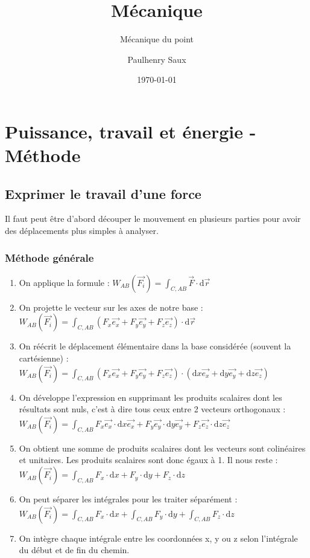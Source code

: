 \documentclass[french]{yLectureNote}
\title{Mécanique}
\subtitle{Mécanique du point}
\author{Paulhenry Saux}
\date{\today}
\renewcommand{\vec}{\overrightarrow}
\newcommand{\dd}[0]{\mathrm{d}}
\begin{document}
\setcounter{chapter}{7}
	\chapter{Puissance, travail et énergie - Méthode}
\section{Exprimer le travail d'une force}
Il faut peut \^etre d'abord découper le mouvement en plusieurs parties pour avoir des déplacements plus simples à analyser.
\subsection{Méthode générale}
\begin{enumerate}
 \item On applique la formule : $W_{AB}(\vec{F_i}) = \int_{C,AB}\vec{F}\cdot \dd \vec{r}$
 \item On projette le vecteur sur les axes de notre base : $W_{AB}(\vec{F_i}) = \int_{C,AB}(F_x\vec{e_x}+F_y\vec{e_y}+F_z\vec{e_z})\cdot \dd \vec{r}$
 \item On réécrit le déplacement élémentaire dans la base considérée (souvent la cartésienne) : $W_{AB}(\vec{F_i}) = \int_{C,AB}(F_x\vec{e_x}+F_y\vec{e_y}+F_z\vec{e_z})\cdot (\dd x \vec{e_x} + \dd y \vec{e_y} + \dd z \vec{e_z})$
 \item On développe l'expression en supprimant les produits scalaires dont les résultats sont nuls, c'est à dire tous ceux entre 2 vecteurs orthogonaux :
 $W_{AB}(\vec{F_i}) = \int_{C,AB}F_x\vec{e_x}\cdot \dd x \vec{e_x}+F_y\vec{e_y}\cdot \dd y \vec{e_y}+F_z\vec{e_z}\cdot \dd z \vec{e_z}$
 \item On obtient une somme de produits scalaires dont les vecteurs sont colinéaires et unitaires. Les produits scalaires sont donc égaux à 1. Il nous reste :
  $W_{AB}(\vec{F_i}) = \int_{C,AB}F_x\cdot \dd x +F_y\cdot \dd y+F_z\cdot \dd z$
  \item On peut séparer les intégrales pour les traiter séparément :
  $W_{AB}(\vec{F_i}) = \int_{C,AB}F_x\cdot \dd x +\int_{C,AB}F_y\cdot \dd y+\int_{C,AB}F_z\cdot \dd z$
  \item On intègre chaque intégrale entre les coordonnées x, y ou z selon l'intégrale du début et de fin du chemin.
\end{enumerate}
\end{document}
